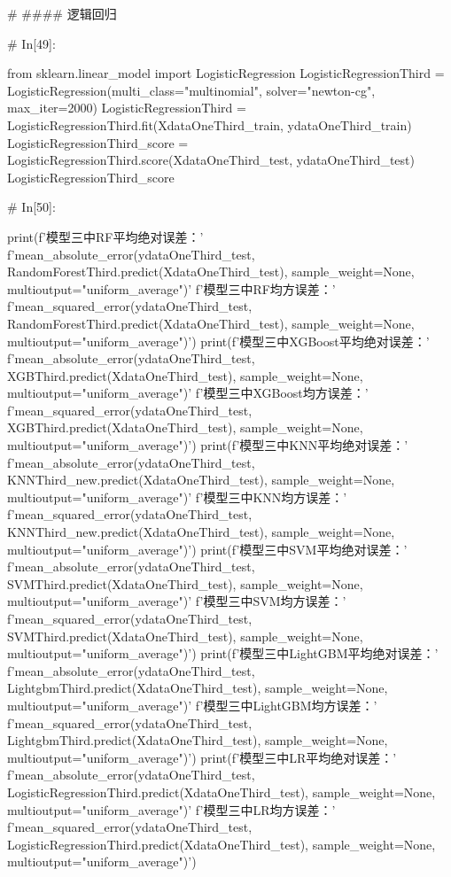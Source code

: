 \documentclass{MathorCupmodeling}
\begin{document}
\begin{python}
# #### 逻辑回归

# In[49]:


from sklearn.linear_model import LogisticRegression
LogisticRegressionThird = LogisticRegression(multi_class="multinomial", solver="newton-cg", max_iter=2000)
LogisticRegressionThird = LogisticRegressionThird.fit(XdataOneThird_train, ydataOneThird_train)
LogisticRegressionThird_score = LogisticRegressionThird.score(XdataOneThird_test, ydataOneThird_test)
LogisticRegressionThird_score


# In[50]:


print(f'模型三中RF平均绝对误差：'
      f'{mean_absolute_error(ydataOneThird_test, RandomForestThird.predict(XdataOneThird_test), sample_weight=None, multioutput="uniform_average")}\n'
      f'模型三中RF均方误差：'
      f'{mean_squared_error(ydataOneThird_test, RandomForestThird.predict(XdataOneThird_test), sample_weight=None, multioutput="uniform_average")}')
print(f'模型三中XGBoost平均绝对误差：'
      f'{mean_absolute_error(ydataOneThird_test, XGBThird.predict(XdataOneThird_test), sample_weight=None, multioutput="uniform_average")}\n'
      f'模型三中XGBoost均方误差：'
      f'{mean_squared_error(ydataOneThird_test, XGBThird.predict(XdataOneThird_test), sample_weight=None, multioutput="uniform_average")}')
print(f'模型三中KNN平均绝对误差：'
      f'{mean_absolute_error(ydataOneThird_test, KNNThird_new.predict(XdataOneThird_test), sample_weight=None, multioutput="uniform_average")}\n'
      f'模型三中KNN均方误差：'
      f'{mean_squared_error(ydataOneThird_test, KNNThird_new.predict(XdataOneThird_test), sample_weight=None, multioutput="uniform_average")}')
print(f'模型三中SVM平均绝对误差：'
      f'{mean_absolute_error(ydataOneThird_test, SVMThird.predict(XdataOneThird_test), sample_weight=None, multioutput="uniform_average")}\n'
      f'模型三中SVM均方误差：'
      f'{mean_squared_error(ydataOneThird_test, SVMThird.predict(XdataOneThird_test), sample_weight=None, multioutput="uniform_average")}')
print(f'模型三中LightGBM平均绝对误差：'
      f'{mean_absolute_error(ydataOneThird_test, LightgbmThird.predict(XdataOneThird_test), sample_weight=None, multioutput="uniform_average")}\n'
      f'模型三中LightGBM均方误差：'
      f'{mean_squared_error(ydataOneThird_test, LightgbmThird.predict(XdataOneThird_test), sample_weight=None, multioutput="uniform_average")}')
print(f'模型三中LR平均绝对误差：'
      f'{mean_absolute_error(ydataOneThird_test, LogisticRegressionThird.predict(XdataOneThird_test), sample_weight=None, multioutput="uniform_average")}\n'
      f'模型三中LR均方误差：'
      f'{mean_squared_error(ydataOneThird_test, LogisticRegressionThird.predict(XdataOneThird_test), sample_weight=None, multioutput="uniform_average")}')



\end{python}
\end{document}
